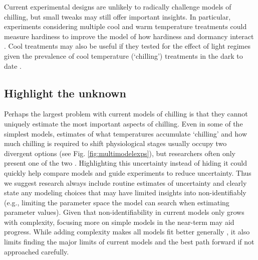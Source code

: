 \documentclass[11pt]{article}
\begin{document}
Current experimental designs are unlikely to radically challenge models of chilling, but small tweaks may still offer important insights. In particular, experiments considering multiple cool and warm temperature treatments could measure hardiness to improve the model of how hardiness and dormancy interact \citep{kovaleskipreprint}. Cool treatments may also be useful if they tested for the effect of light regimes given the prevalence of cool temperature (`chilling') treatments in the dark to date \citep{ospreebbms}. 

\subsection*{Highlight the unknown} 
Perhaps the largest problem with current models of chilling is that they cannot uniquely estimate the most important aspects of chilling. Even in some of the simplest models, estimates of what temperatures accumulate `chilling' and how much chilling is required to shift physiological stages usually occupy two divergent options (see Fig. \ref{fig:multimodelexps}), but researchers often only present one of the two \citep{chuine2016}.
Highlighting this uncertainty instead of hiding it could quickly help compare models and guide experiments to reduce uncertainty. Thus we suggest research always include routine estimates of uncertainty and clearly state any modeling choices that may have limited insights into non-identifiably 
(e.g., limiting the parameter space the model can search when estimating parameter values). Given that non-identifiability in current models only grows with complexity, focusing more on simple models in the near-term may aid progress. While adding complexity makes all models fit better generally \citep{statrethink}, it also limits finding the major limits of current models and the best path forward if not approached carefully. 
\end{document}
